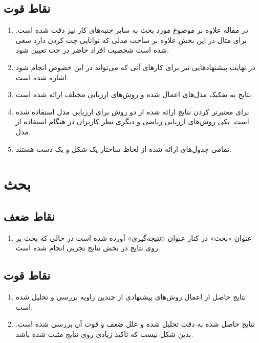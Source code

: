 \documentclass[14pt,a4]{article}
\begin{document}
\subsection{نقاط قوت}

\begin{enumerate}
    \item در مقاله علاوه بر موضوع مورد بحث به سایر جنبه‌های کار نیز دقت شده است.
    برای مثال در این بخش علاوه بر ساخت مدلی که توانایی چت کردن دارد سعی شده است شخصیت افراد حاضر در چت تعیین شود.
    \item در نهایت پیشنهاد‌هایی نیز برای کار‌های آتی که می‌تواند در این خصوص انجام شود اشاره شده است.
    \item نتایج به تفکیک مدل‌های اعمال شده و روش‌های ارزیابی مختلف ارائه شده است.
    \item برای معتبرتر کردن نتایج ارائه شده از دو روش برای ارزیابی مدل استفاده شده است.
    یکی روش‌های ارزیابی ریاضی و دیگری نظر کاربران در هنگام استفاده از مدل.
    \item تمامی جدول‌های ارائه شده از لحاظ ساختار یک شکل و یک دست هستند.
\end{enumerate}

\section{بحث}

\subsection{نقاط ضعف}

\begin{enumerate}
    \item عنوان «بحث» در کنار عنوان «نتیجه‌گیری» آورده شده است در حالی که بحث بر روی نتایج در بخش
    نتایج تجربی انجام شده است.
\end{enumerate}

\subsection{نقاط قوت}

\begin{enumerate}
    \item نتایج حاصل از اعمال روش‌های پیشنهادی از چندین زاویه بررسی و تحلیل شده است.
    \item نتایج حاصل شده به دقت تحلیل شده و
    علل ضعف و قوت آن بررسی شده است. بدین شکل نیست که تاکید زیادی روی نتایج مثبت شده باشد.
\end{enumerate}
\end{document}
